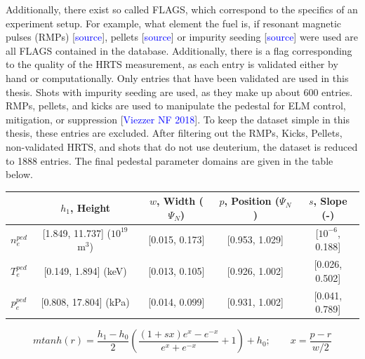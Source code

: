 \documentclass[a4paper, twoside, final, 12pt]{article}
\begin{document}
Additionally, there exist so called FLAGS, which correspond to the specifics of an experiment setup.
For example, what element the fuel is, if resonant magnetic pulses (RMPs) [\textcolor{blue}{source}], pellets [\textcolor{blue}{source}] or impurity seeding [\textcolor{blue}{source}] were used are all FLAGS contained in the database.
Additionally, there is a flag corresponding to the quality of the HRTS measurement, as each entry is validated either by hand or computationally.
Only entries that have been validated are used in this thesis.
Shots with impurity seeding are used, as they make up about 600 entries.
RMPs, pellets, and kicks are used to manipulate the pedestal for ELM control, mitigation, or suppression [\textcolor{blue}{Viezzer NF 2018}].
To keep the dataset simple in this thesis, these entries are excluded.
After filtering out the RMPs, Kicks, Pellets, non-validated HRTS, and shots that do not use deuterium, the dataset is reduced to 1888 entries. The final pedestal parameter domains are given in the table below.
\begin{center}
\begin{tabular}{ | c | c | c | c | c | }
	\hline 
	& $h_1$, Height & $w$, Width ($\Psi_N$) & $p$, Position ($\Psi_N$) & $s$, Slope (-) \\ 
	\hline
	$n_e^{ped}$ &[1.849, 11.737] ($10^{19}$ m$^3$) & [0.015, 0.173]& [0.953, 1.029] & [$10^{-6}$, 0.188] \\
	$T_e^{ped}$ & [0.149, 1.894] (keV)& [0.013, 0.105] & [0.926, 1.002] & [0.026, 0.502] \\
	$p_e^{ped}$ & [0.808, 17.804] (kPa)& [0.014, 0.099] & [0.931, 1.002]& [0.041, 0.789] \\
	\hline
\end{tabular}
\end{center}

\begin{equation} \label{eq:mtanh}
mtanh(r) = \frac{h_1 - h_0}{2} \left( \frac{(1+sx)e^x - e^{-x}}{e^x + e^{-x}} +1 \right) + h_0; \quad \quad x = \frac{p-r}{w/2}
\end{equation}
\end{document}

